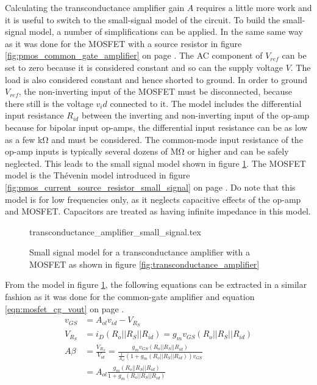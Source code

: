 \documentclass[12pt]{book}
\begin{document}
Calculating the transconductance amplifier gain $A$ requires a little more work and it is useful to switch to the small-signal model of the circuit. To build the small-signal model, a number of simplifications can be applied. In the same same way as it was done for the MOSFET with a source resistor in figure \ref{fig:pmos_common_gate_amplifier} on page \pageref{fig:pmos_common_gate_amplifier}. The AC component of $V_{ref}$ can be set to zero because it is considered constant and so can the supply voltage $V$. The load is also considered constant and hence shorted to ground. In order to ground $V_{ref}$, the non-inverting input of the MOSFET must be disconnected, because there still is the voltage $v_id$ connected to it. The model includes the differential input resistance $R_{id}$ between the inverting and non-inverting input of the op-amp because for bipolar input op-amps, the differential input resistance can be as low as a few \unit{\kilo\ohm} and must be considered. The common-mode input resistance of the op-amp inputs is typically several dozens of \unit{\mega \ohm} or higher and can be safely neglected. This leads to the small signal model shown in figure \ref{fig:transconductance_amplifier_small_signal}. The MOSFET model is the Thévenin model introduced in figure \ref{fig:pmos_current_source_resistor_small_signal} on page \pageref{fig:pmos_current_source_resistor_small_signal}. Do note that this model is for low frequencies only, as it neglects capacitive effects of the op-amp and MOSFET. Capacitors are treated as having infinite impedance in this model.

\begin{figure}[hb]
    \centering
        {transconductance_amplifier_small_signal.tex}
    \caption{Small signal model for a transconductance amplifier with a MOSFET as shown in figure \ref{fig:transconductance_amplifier}}
    \label{fig:transconductance_amplifier_small_signal}
\end{figure}

From the model in figure \ref{fig:transconductance_amplifier_small_signal}, the following equations can be extracted in a similar fashion as it was done for the common-gate amplifier and equation \ref{eqn:mosfet_cg_vout} on page \pageref{eqn:mosfet_cg_vout}.
\begin{align}
    v_{GS} &= A_{ol} v_{id} - V_{R_S}\\
    V_{R_S} &= i_D \left(R_o || R_S || R_{id}\right) = g_m v_{GS} \left(R_o || R_S || R_{id}\right)\\
    A\beta &= \frac{V_{R_S}}{V_{id}} = \frac{g_m v_{GS} \left(R_o || R_S || R_{id}\right)}{\frac{1}{A_{ol}} \left(1 + g_m \left(R_o || R_S || R_{id}\right)\right) v_{GS}} \nonumber\\
    &= A_{ol} \frac{g_m \left(R_o || R_S || R_{id}\right)}{1 + g_m \left(R_o || R_S || R_{id}\right)}
\end{align}
\end{document}
